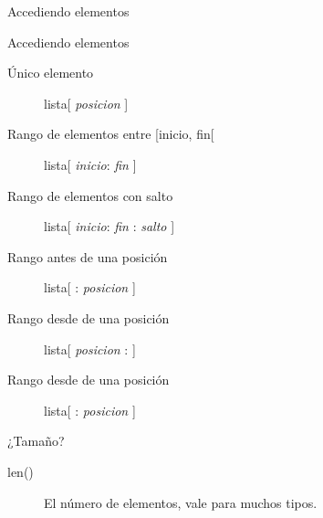 \documentclass[bigger,unknownkeysallowed]{beamer}
\begin{document}
\begin{frame}[label={sec:org2d08081}]{Accediendo elementos}
\begin{block}{Accediendo elementos}
\begin{description}
\item[{Único elemento}] lista[ \emph{posicion} ]
\item[{Rango de elementos entre [inicio, fin[}] lista[ \emph{inicio}: \emph{fin} ]
\item[{Rango de elementos con salto}] lista[ \emph{inicio}: \emph{fin} : \emph{salto} ]
\item[{Rango antes de una posición}] lista[ : \emph{posicion} ]
\item[{Rango desde de una posición}] lista[ \emph{posicion} : ]
\item[{Rango desde de una posición}] lista[ : \emph{posicion} ]
\end{description}
\end{block}

\begin{block}{¿Tamaño?}
\begin{description}
\item[{len()}] El número de elementos, vale para muchos tipos.
\end{description}
\end{block}
\end{frame}
\end{document}

